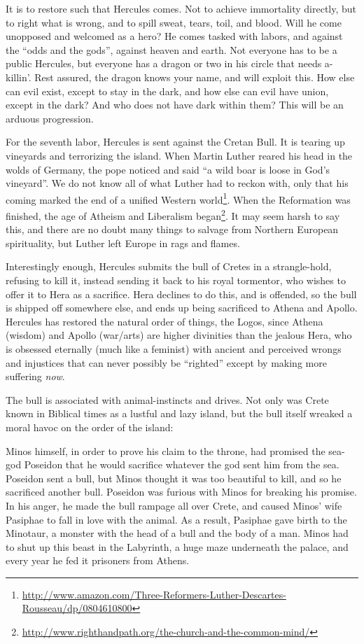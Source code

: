 It is to restore such that Hercules comes. Not to achieve immortality directly, but to right what is wrong, and to spill sweat, tears, toil, and blood. Will he come unopposed and welcomed as a hero? He comes tasked with labors, and against the ``odds and the gods'', against heaven and earth. Not everyone has to be a public Hercules, but everyone has a dragon or two in his circle that needs a-killin'. Rest assured, the dragon knows your name, and will exploit this. How else can evil exist, except to stay in the dark, and how else can evil have union, except in the dark? And who does not have dark within them? This will be an arduous progression.

For the seventh labor, Hercules is sent against the Cretan Bull. It is tearing up vineyards and terrorizing the island. When Martin Luther reared his head in the wolds of Germany, the pope noticed and said ``a wild boar is loose in God's vineyard''. We do not know all of what Luther had to reckon with, only that his coming marked the end of a unified Western world\footnote{\url{http://www.amazon.com/Three-Reformers-Luther-Descartes-Rousseau/dp/0804610800}}. When the Reformation was finished, the age of Atheism and Liberalism began\footnote{\url{http://www.righthandpath.org/the-church-and-the-common-mind/}}. It may seem harsh to say this, and there are no doubt many things to salvage from Northern European spirituality, but Luther left Europe in rags and flames.

Interestingly enough, Hercules submits the bull of Cretes in a strangle-hold, refusing to kill it, instead sending it back to his royal tormentor, who wishes to offer it to Hera as a sacrifice. Hera declines to do this, and is offended, so the bull is shipped off somewhere else, and ends up being sacrificed to Athena and Apollo. Hercules has restored the natural order of things, the Logos, since Athena (wisdom) and Apollo (war/arts) are higher divinities than the jealous Hera, who is obsessed eternally (much like a feminist) with ancient and perceived wrongs and injustices that can never possibly be ``righted'' except by making more suffering \emph{now}.

The bull is associated with animal-instincts and drives. Not only was Crete known in Biblical times as a lustful and lazy island, but the bull itself wreaked a moral havoc on the order of the island:

\begin{quotex}
Minos himself, in order to prove his claim to the throne, had promised the sea-god Poseidon that he would sacrifice whatever the god sent him from the sea. Poseidon sent a bull, but Minos thought it was too beautiful to kill, and so he sacrificed another bull. Poseidon was furious with Minos for breaking his promise. In his anger, he made the bull rampage all over Crete, and caused Minos' wife Pasiphae to fall in love with the animal. As a result, Pasiphae gave birth to the Minotaur, a monster with the head of a bull and the body of a man. Minos had to shut up this beast in the Labyrinth, a huge maze underneath the palace, and every year he fed it prisoners from Athens.
\end{quotex}


